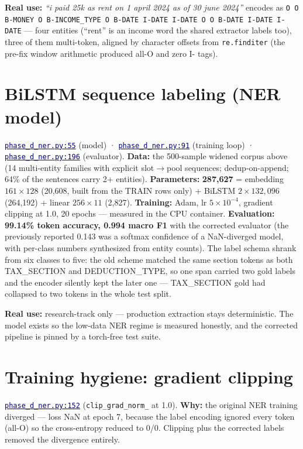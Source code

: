 \documentclass[11pt,a4paper]{article}
\newcommand{\code}[2]{\href{https://github.com/Jayant1711/Tax_Assist-system/blob/v0.7-sprint7/#1}{\texttt{\textcolor{navy}{#2}}}}
\newcommand{\facts}[1]{{\small\textcolor{muted}{#1}\par}}
\begin{document}
\begin{examplebox}
\textbf{Real use:} \emph{``i paid 25k as rent on 1 april 2024 as of 30 june 2024''}
encodes as \texttt{O O B-MONEY O B-INCOME\_TYPE O B-DATE I-DATE I-DATE O O
B-DATE I-DATE I-DATE} --- four entities (``rent'' is an income word the shared
extractor labels too), three of them multi-token, aligned by character
offsets from \texttt{re.finditer} (the pre-fix window arithmetic produced
all-O and zero I- tags).
\end{examplebox}

\section{BiLSTM sequence labeling (NER model)}
\facts{\code{nlp\_research/phase\_d\_ner.py}{phase\_d\_ner.py:55} (model) ·
\code{nlp\_research/phase\_d\_ner.py}{phase\_d\_ner.py:91} (training loop) ·
\code{nlp\_research/phase\_d\_ner.py}{phase\_d\_ner.py:196} (evaluator).
\textbf{Data:} the 500-sample widened corpus above (14 multi-entity families
with explicit slot$\rightarrow$pool sequences; dedup-on-append; 64\% of the
sentences carry 2+ entities). \textbf{Parameters:}
\textbf{287,627} = embedding $161 \times 128$ (20,608, built from the TRAIN
rows only) + BiLSTM $2 \times
132{,}096$ (264,192) + linear $256 \times 11$ (2,827). \textbf{Training:}
Adam, lr $5{\times}10^{-4}$, gradient clipping at 1.0, 20 epochs ---
measured in the CPU container. \textbf{Evaluation:}
\textbf{99.14\% token accuracy, 0.994 macro F1} with the corrected evaluator
(the previously reported 0.143 was a softmax confidence of a NaN-diverged model,
with per-class numbers synthesized from entity counts). The label schema
shrank from six classes to five: the old scheme matched the same section
tokens as both TAX\_SECTION and DEDUCTION\_TYPE, so one span carried two gold
labels and the encoder silently kept the later one --- TAX\_SECTION gold had
collapsed to two tokens in the whole test split.}

\begin{examplebox}
\textbf{Real use:} research-track only --- production extraction stays
deterministic. The model exists so the low-data NER regime is measured
honestly, and the corrected pipeline is pinned by a torch-free test suite.
\end{examplebox}

\section{Training hygiene: gradient clipping}
\facts{\code{nlp\_research/phase\_d\_ner.py}{phase\_d\_ner.py:152}
(\texttt{clip\_grad\_norm\_} at 1.0). \textbf{Why:} the original NER training
diverged --- loss NaN at epoch 7, because the label encoding ignored every token
(all-O) so the cross-entropy reduced to 0/0. Clipping plus the corrected labels
removed the divergence entirely.}
\end{document}
